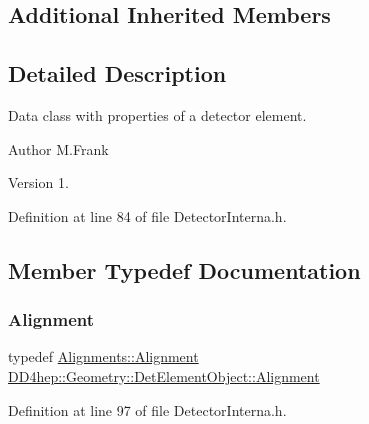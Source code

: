\subsection*{Additional Inherited Members}


\subsection{Detailed Description}
Data class with properties of a detector element. 

\begin{DoxyAuthor}{Author}
M.\+Frank 
\end{DoxyAuthor}
\begin{DoxyVersion}{Version}
1. 
\end{DoxyVersion}


Definition at line 84 of file Detector\+Interna.\+h.



\subsection{Member Typedef Documentation}
\hypertarget{class_d_d4hep_1_1_geometry_1_1_det_element_object_aaf1bb49d0e1799f548f775b35e3cb590}{}\label{class_d_d4hep_1_1_geometry_1_1_det_element_object_aaf1bb49d0e1799f548f775b35e3cb590} 
\subsubsection{\texorpdfstring{Alignment}{Alignment}}
{\footnotesize\ttfamily typedef \hyperlink{class_d_d4hep_1_1_alignments_1_1_alignment}{Alignments\+::\+Alignment} \hyperlink{class_d_d4hep_1_1_geometry_1_1_det_element_object_aaf1bb49d0e1799f548f775b35e3cb590}{D\+D4hep\+::\+Geometry\+::\+Det\+Element\+Object\+::\+Alignment}}



Definition at line 97 of file Detector\+Interna.\+h.

\hypertarget{class_d_d4hep_1_1_geometry_1_1_det_element_object_ab920e3c690de8d093cb556b0d3c87ce8}{}\label{class_d_d4hep_1_1_geometry_1_1_det_element_object_ab920e3c690de8d093cb556b0d3c87ce8} 
